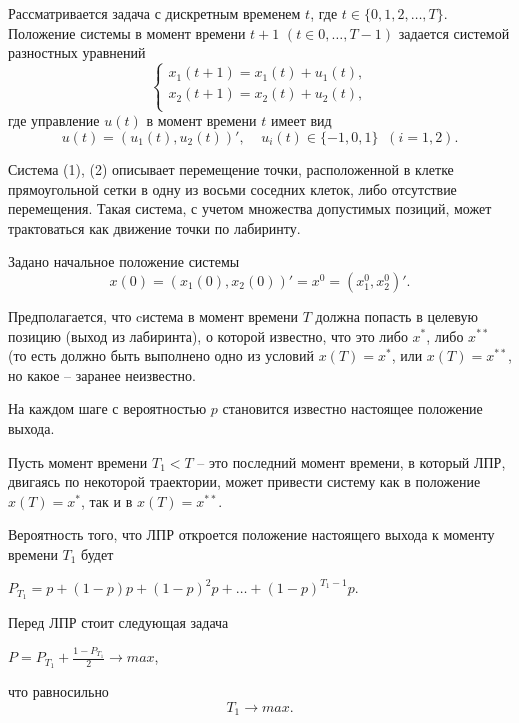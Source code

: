 Рассматривается задача с дискретным временем $t$, где $t\in\{0,1,2,\ldots,T\}$.
Положение системы в момент времени $t+1$  $(t \in 0, \ldots,T-1)$ задается системой разностных уравнений
\begin{equation} \label{eq1}
		\begin{cases}%
			x_1(t+1)=x_1(t)+u_1(t),\\
			x_2(t+1)=x_2(t)+u_2(t),\\
		\end{cases}
\end{equation}
где управление $u(t)$ в момент времени $t$ имеет вид
\begin{equation} \label{eq2}
u(t)= (u_1(t),u_2(t))', \;\;\;\; u_i(t) \in \{-1,0, 1\} \;\; (i=1,2).
\end{equation}

Система (1), (2) описывает перемещение точки, расположенной в клетке прямоугольной сетки в одну из восьми соседних клеток, либо отсутствие перемещения. %
Такая система, с учетом множества допустимых позиций, может трактоваться как движение точки по лабиринту.

Задано начальное положение системы
\begin{equation} \label{eq3}
 x(0)=(x_1(0),x_2(0))'=x^0=(x_1^0,x_2^0)'.
\end{equation}

Предполагается, что cистема в момент времени $T$ должна попасть в целевую позицию (выход из лабиринта), о которой известно, что это либо $x^*$, либо $x^{**}$ (то есть должно быть выполнено одно из условий $x(T)=x^*$, или $x(T)=x^{**}$, но какое -- заранее неизвестно.

На каждом шаге с вероятностью $p$ становится известно настоящее положение выхода.

Пусть момент времени $T_1<T$ -- это последний момент времени, в который ЛПР, двигаясь по некоторой траектории, может привести систему как в положение $x(T)=x^*$, так и в $x(T)=x^{**}$.

Вероятность того, что ЛПР откроется положение настоящего выхода к моменту времени $T_1$ будет
\begin{center}
$P_{T_1}=p+(1-p)p+{(1-p)^2}p+\ldots+{(1-p)^{{T_1}-1}p}$.
\end{center}
Перед ЛПР стоит следующая задача
\begin{center}
$P=P_{T_1}+\frac{1-P_{T_1}}{2}\rightarrow max$,
\end{center}
что равносильно
\begin{equation} \label{eq4}
T_1 \rightarrow max .
\end{equation}


